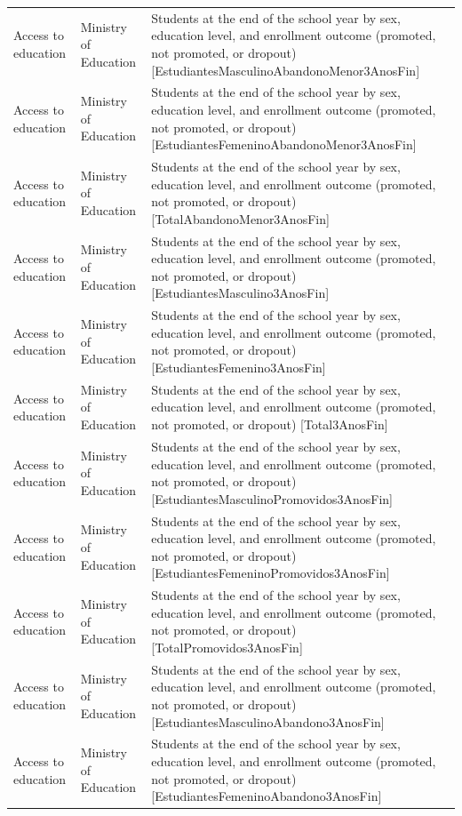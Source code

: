 \documentclass[10pt,a4paper]{article}
\begin{document}
\begin{longtable}{@{}>{\raggedright\arraybackslash}p{3.5cm}>{\raggedright\arraybackslash}p{5.6cm}>{\raggedright\arraybackslash}p{\dimexpr\textwidth-9.1cm-4\tabcolsep\relax}@{}}
Access to education & Ministry of Education & Students at the end of the school year by sex, education level, and enrollment outcome (promoted, not promoted, or dropout) [EstudiantesMasculinoAbandonoMenor3AnosFin]\\
Access to education & Ministry of Education & Students at the end of the school year by sex, education level, and enrollment outcome (promoted, not promoted, or dropout) [EstudiantesFemeninoAbandonoMenor3AnosFin]\\
Access to education & Ministry of Education & Students at the end of the school year by sex, education level, and enrollment outcome (promoted, not promoted, or dropout) [TotalAbandonoMenor3AnosFin]\\
Access to education & Ministry of Education & Students at the end of the school year by sex, education level, and enrollment outcome (promoted, not promoted, or dropout) [EstudiantesMasculino3AnosFin]\\
Access to education & Ministry of Education & Students at the end of the school year by sex, education level, and enrollment outcome (promoted, not promoted, or dropout) [EstudiantesFemenino3AnosFin]\\
Access to education & Ministry of Education & Students at the end of the school year by sex, education level, and enrollment outcome (promoted, not promoted, or dropout) [Total3AnosFin]\\
Access to education & Ministry of Education & Students at the end of the school year by sex, education level, and enrollment outcome (promoted, not promoted, or dropout) [EstudiantesMasculinoPromovidos3AnosFin]\\
Access to education & Ministry of Education & Students at the end of the school year by sex, education level, and enrollment outcome (promoted, not promoted, or dropout) [EstudiantesFemeninoPromovidos3AnosFin]\\
Access to education & Ministry of Education & Students at the end of the school year by sex, education level, and enrollment outcome (promoted, not promoted, or dropout) [TotalPromovidos3AnosFin]\\
Access to education & Ministry of Education & Students at the end of the school year by sex, education level, and enrollment outcome (promoted, not promoted, or dropout) [EstudiantesMasculinoAbandono3AnosFin]\\
Access to education & Ministry of Education & Students at the end of the school year by sex, education level, and enrollment outcome (promoted, not promoted, or dropout) [EstudiantesFemeninoAbandono3AnosFin]\\

\end{longtable}
\end{document}
